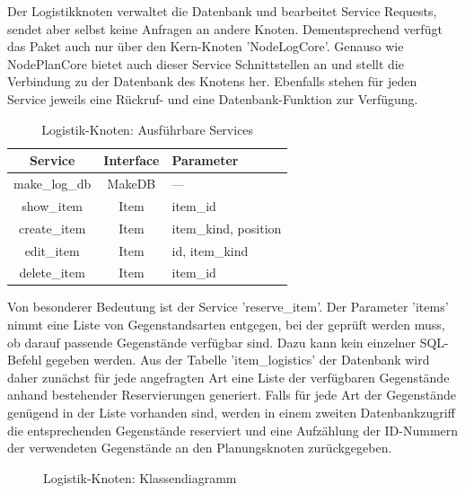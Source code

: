 Der Logistikknoten verwaltet die Datenbank und bearbeitet Service Requests, sendet aber selbst keine Anfragen an andere Knoten. Dementsprechend verfügt das Paket auch nur über den Kern-Knoten 'NodeLogCore'. Genauso wie NodePlanCore bietet auch dieser Service Schnittstellen an und stellt die Verbindung zu der Datenbank des Knotens her. Ebenfalls stehen für jeden Service jeweils eine Rückruf- und eine Datenbank-Funktion zur Verfügung.

\begin{table}[h]
\begin{center}
\begin{tabular}{| c | c | l |}
  \hline
  Service        & Interface & Parameter                                         \\
  \hline
  \hline
  make\_log\_db  & MakeDB    & ---                                               \\
  show\_item     & Item      & item\_id                                          \\
  create\_item   & Item      & item\_kind, position                              \\
  edit\_item     & Item      & id, item\_kind                                    \\
  delete\_item   & Item      & item\_id                                          \\
  \hline
\end{tabular}
\caption{Logistik-Knoten: Ausführbare Services}
\end{center}
\end{table}

Von besonderer Bedeutung ist der Service 'reserve\_item'. Der Parameter 'items' nimmt eine Liste von Gegenstandsarten entgegen, bei der geprüft werden muss, ob darauf passende Gegenstände verfügbar sind. Dazu kann kein einzelner SQL-Befehl gegeben werden. Aus der Tabelle 'item\_logistics' der Datenbank wird daher zunächst für jede angefragten Art eine Liste der verfügbaren Gegenstände anhand bestehender Reservierungen generiert. Falls für jede Art der Gegenstände genügend in der Liste vorhanden sind, werden in einem zweiten Datenbankzugriff die entsprechenden Gegenstände reserviert und eine Aufzählung der ID-Nummern der verwendeten Gegenstände an den Planungsknoten zurückgegeben.

\begin{figure}
\begin{center}
\caption{Logistik-Knoten: Klassendiagramm}
\end{center}
\end{figure}


